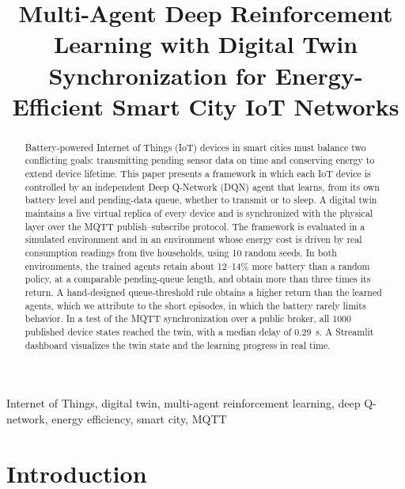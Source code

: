 \documentclass[conference]{IEEEtran}
\begin{document}
\title{Multi-Agent Deep Reinforcement Learning with Digital Twin Synchronization for Energy-Efficient Smart City IoT Networks}

\author{
}

\maketitle

\begin{abstract}
Battery-powered Internet of Things (IoT) devices in smart cities must balance two conflicting goals: transmitting pending sensor data on time and conserving energy to extend device lifetime. This paper presents a framework in which each IoT device is controlled by an independent Deep Q-Network (DQN) agent that learns, from its own battery level and pending-data queue, whether to transmit or to sleep. A digital twin maintains a live virtual replica of every device and is synchronized with the physical layer over the MQTT publish--subscribe protocol. The framework is evaluated in a simulated environment and in an environment whose energy cost is driven by real consumption readings from five households, using 10 random seeds. In both environments, the trained agents retain about 12--14\% more battery than a random policy, at a comparable pending-queue length, and obtain more than three times its return. A hand-designed queue-threshold rule obtains a higher return than the learned agents, which we attribute to the short episodes, in which the battery rarely limits behavior. In a test of the MQTT synchronization over a public broker, all 1000 published device states reached the twin, with a median delay of 0.29~s. A Streamlit dashboard visualizes the twin state and the learning progress in real time.
\end{abstract}

\begin{IEEEkeywords}
Internet of Things, digital twin, multi-agent reinforcement learning, deep Q-network, energy efficiency, smart city, MQTT
\end{IEEEkeywords}

\section{Introduction}
\label{sec:intro}
\end{document}
